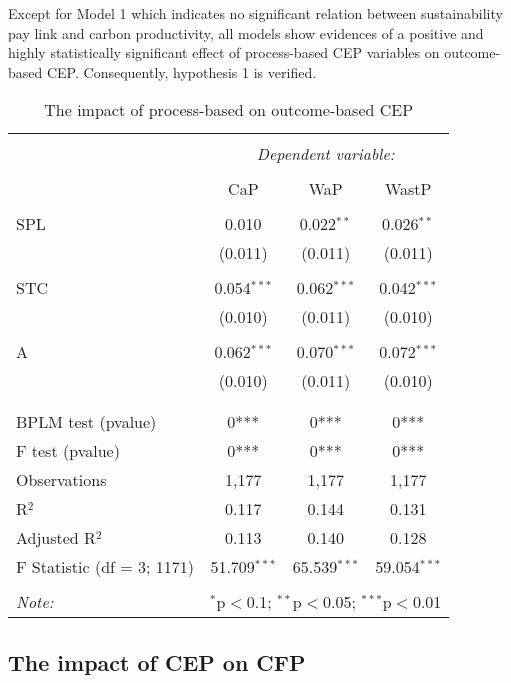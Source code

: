 \documentclass[]{article}
\begin{document}
Except for Model 1 which indicates no significant relation between
sustainability pay link and carbon productivity, all models show
evidences of a positive and highly statistically significant effect of
process-based CEP variables on outcome-based CEP. Consequently,
hypothesis 1 is verified.

\begin{table}[!] \centering 
  \caption{The impact of process-based on outcome-based CEP} 
  \label{CepResults} 
\begin{tabular}{@{\extracolsep{5pt}}lccc} 
\\[-1.8ex]\hline 
\hline \\[-1.8ex] 
 & \multicolumn{3}{c}{\textit{Dependent variable:}} \\ 
\cline{2-4} 
\\[-1.8ex] & CaP & WaP & WastP \\ 
\hline \\[-1.8ex] 
 SPL & 0.010 & 0.022$^{**}$ & 0.026$^{**}$ \\ 
  & (0.011) & (0.011) & (0.011) \\ 
  & & & \\ 
 STC & 0.054$^{***}$ & 0.062$^{***}$ & 0.042$^{***}$ \\ 
  & (0.010) & (0.011) & (0.010) \\ 
  & & & \\ 
 A & 0.062$^{***}$ & 0.070$^{***}$ & 0.072$^{***}$ \\ 
  & (0.010) & (0.011) & (0.010) \\ 
  & & & \\ 
\hline \\[-1.8ex] 
BPLM test (pvalue) & 0*** & 0*** & 0*** \\ 
F test (pvalue) & 0*** & 0*** & 0*** \\ 
Observations & 1,177 & 1,177 & 1,177 \\ 
R$^{2}$ & 0.117 & 0.144 & 0.131 \\ 
Adjusted R$^{2}$ & 0.113 & 0.140 & 0.128 \\ 
F Statistic (df = 3; 1171) & 51.709$^{***}$ & 65.539$^{***}$ & 59.054$^{***}$ \\ 
\hline 
\hline \\[-1.8ex] 
\textit{Note:}  & \multicolumn{3}{r}{$^{*}$p$<$0.1; $^{**}$p$<$0.05; $^{***}$p$<$0.01} \\ 
\end{tabular} 
\end{table}

\subsection{The impact of CEP on CFP}\label{the-impact-of-cep-on-cfp}
\end{document}
